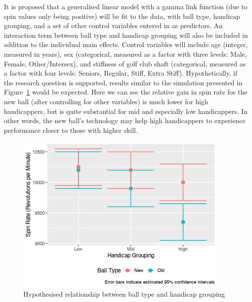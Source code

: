 \documentclass{article}
\begin{document}
It is proposed that a generalised linear model with a gamma link function (due to spin values only being positive) will be fit to the data, with ball type, handicap grouping, and a set of other control variables entered in as predictors. 
An interaction term between ball type and handicap grouping will also be included in addition to the individual main effects. 
Control variables will include age (integer, measured in years), sex (categorical, measured as a factor with three levels: Male, Female, Other/Intersex), and stiffness of golf club shaft (categorical, measured as a factor with four levels: Seniors, Regular, Stiff, Extra Stiff). 
Hypothetically, if the research question is supported, results similar to the simulation presented in Figure~\ref{fig:expectations} would be expected.
Here we can see the relative gain in spin rate for the new ball (after controlling for other variables) is much lower for high handicappers, but is quite substantial for mid and especially low handicappers. 
In other words, the new ball's technology may help high handicappers to experience performance closer to those with higher skill.

\begin{figure}[t!]
    \centering
    \includegraphics[max width=\linewidth]{expectations}
    \caption{\label{fig:expectations}Hypothesised relationship between ball type and handicap grouping}
\end{figure}
\end{document}
